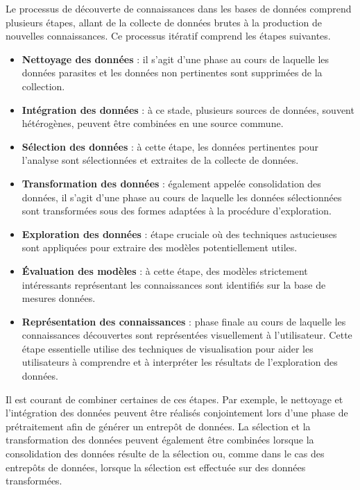 \documentclass[a4paper,14pt]{article}
\begin{document}
        Le processus de découverte de connaissances dans les bases de données comprend plusieurs étapes, allant de la collecte de données brutes à la production de nouvelles connaissances. Ce processus itératif comprend les étapes suivantes.

        \begin{itemize}
            \item \textbf{Nettoyage des données} : il s’agit d’une phase au cours de laquelle les données parasites et les données non pertinentes sont supprimées de la collection.
            \item \textbf{Intégration des données} : à ce stade, plusieurs sources de données, souvent hétérogènes, peuvent être combinées en une source commune.
            \item \textbf{Sélection des données} : à cette étape, les données pertinentes pour l’analyse sont sélectionnées et extraites de la collecte de données.
            \item \textbf{Transformation des données} : également appelée consolidation des données, il s’agit d’une phase au cours de laquelle les données sélectionnées sont transformées sous des formes adaptées à la procédure d’exploration.
            \item \textbf{Exploration des données} : étape cruciale où des techniques astucieuses sont appliquées pour extraire des modèles potentiellement utiles.
            \item \textbf{Évaluation des modèles} : à cette étape, des modèles strictement intéressants représentant les connaissances sont identifiés sur la base de mesures données.
            \item \textbf{Représentation des connaissances} : phase finale au cours de laquelle les connaissances découvertes sont représentées visuellement à l’utilisateur. Cette étape essentielle utilise des techniques de visualisation pour aider les utilisateurs à comprendre et à interpréter les résultats de l’exploration des données. \\
        
        \end{itemize}

        Il est courant de combiner certaines de ces étapes. Par exemple, le nettoyage et l'intégration des données peuvent être réalisés conjointement lors d'une phase de prétraitement afin de générer un entrepôt de données. La sélection et la transformation des données peuvent également être combinées lorsque la consolidation des données résulte de la sélection ou, comme dans le cas des entrepôts de données, lorsque la sélection est effectuée sur des données transformées.
\end{document}
